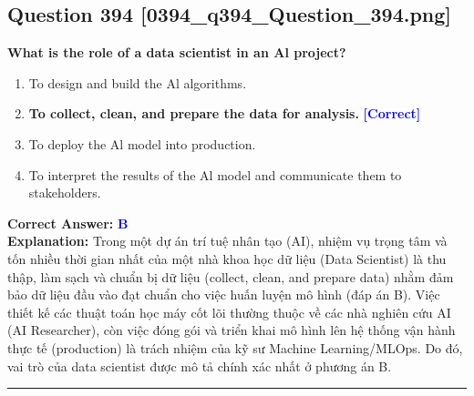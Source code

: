 \documentclass[11pt,a4paper]{article}
\begin{document}
\begin{minipage}{\textwidth}
\subsection*{Question 394 \quad \footnotesize{[0394\_q394\_Question\_394.png]}}
\noindent \textbf{What is the role of a data scientist in an Al project?}

\begin{enumerate}[label=\Alph*.]
    \item To design and build the Al algorithms.
    \item \textbf{To collect, clean, and prepare the data for analysis.} \hfill \textcolor{blue}{\textbf{[Correct]}}
    \item To deploy the Al model into production.
    \item To interpret the results of the Al model and communicate them to stakeholders.
\end{enumerate}

\noindent \textbf{Correct Answer:} \textcolor{blue}{\textbf{B}} \\[2pt]
\noindent \textbf{Explanation:} Trong một dự án trí tuệ nhân tạo (AI), nhiệm vụ trọng tâm và tốn nhiều thời gian nhất của một nhà khoa học dữ liệu (Data Scientist) là thu thập, làm sạch và chuẩn bị dữ liệu (collect, clean, and prepare data) nhằm đảm bảo dữ liệu đầu vào đạt chuẩn cho việc huấn luyện mô hình (đáp án B). Việc thiết kế các thuật toán học máy cốt lõi thường thuộc về các nhà nghiên cứu AI (AI Researcher), còn việc đóng gói và triển khai mô hình lên hệ thống vận hành thực tế (production) là trách nhiệm của kỹ sư Machine Learning/MLOps. Do đó, vai trò của data scientist được mô tả chính xác nhất ở phương án B.

\par\vspace{0.3cm}
\hrule
\vspace{0.3cm}
\end{minipage}
\end{document}
